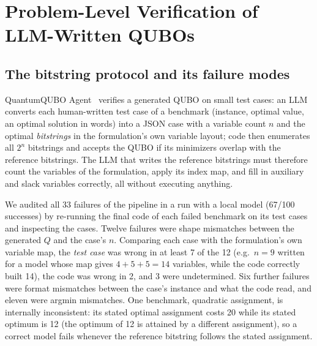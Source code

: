 \section{Problem-Level Verification of LLM-Written QUBOs}
\label{sec:verification}

\subsection{The bitstring protocol and its failure modes}
QuantumQUBO Agent~\citep{mondal2026quantumqubo} verifies a generated QUBO on small test cases: an LLM converts each
human-written test case of a benchmark (instance, optimal value, an optimal solution in words) into a JSON case
with a variable count $n$ and the optimal \emph{bitstrings} in the formulation's own variable layout; code then
enumerates all $2^n$ bitstrings and accepts the QUBO if its minimizers overlap with the reference bitstrings.
The LLM that writes the reference bitstrings must therefore count the variables of the formulation, apply its
index map, and fill in auxiliary and slack variables correctly, all without executing anything.

We audited all 33 failures of the pipeline in a run with a local model (67/100 successes) by re-running the final
code of each failed benchmark on its test cases and inspecting the cases. Twelve failures were shape mismatches
between the generated $Q$ and the case's $n$. Comparing each case with the formulation's own variable map, the
\emph{test case} was wrong in at least 7 of the 12 (e.g.\ $n=9$ written for a model whose map gives
$4+5+5=14$ variables, while the code correctly built 14), the code was wrong in 2, and 3 were undetermined. Six
further failures were format mismatches between the case's instance and what the code read, and eleven were
argmin mismatches. One benchmark, quadratic assignment, is internally inconsistent: its stated optimal assignment
costs 20 while its stated optimum is 12 (the optimum of 12 is attained by a different assignment), so a correct
model fails whenever the reference bitstring follows the stated assignment.

